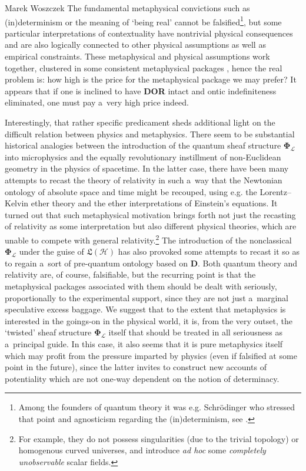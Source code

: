 \begin{artengenv}{Marek Woszczek}
The fundamental metaphysical convictions such as (in)determinism or the meaning of ‘being real' cannot be falsified\footnote{Among the founders of quantum theory it was e.g. Schrödinger who stressed that point and agnosticism regarding the (in)determinism, see
\parencite[][]{schrodinger_science_1935}.%
}, but some particular interpretations of contextuality have nontrivial physical consequences and are also logically connected to other physical assumptions as well as empirical constraints. These metaphysical and physical assumptions work together, clustered in some consistent metaphysical packages 
\parencite[e.g.][]{borges_quantum_2014}, %
 hence the real problem is: how high is the price for the metaphysical package we may prefer? It appears that if one is inclined to have \textbf{DOR} intact and ontic indefiniteness eliminated, one must pay a~very high price indeed.

Interestingly, that rather specific predicament sheds additional light on the difficult relation between physics and metaphysics. There seem to be substantial historical analogies between the introduction of the quantum sheaf structure $\bm{\Phi}_{\mathcal{L}}$ into microphysics and the equally revolutionary instillment of non-Euclidean geometry in the physics of spacetime. In the latter case, there have been many attempts to recast the theory of relativity in such a~way that the Newtonian ontology of absolute space and time might be recouped, using e.g. the Lorentz–Kelvin ether theory and the ether interpretations of Einstein's equations. It turned out that such metaphysical motivation brings forth not just the recasting of relativity as some interpretation but also different physical theories, which are unable to compete with general relativity.\footnote{For example, they do not possess singularities (due to the trivial topology) or homogenous curved universes, and introduce \textit{ad hoc} some \textit{completely unobservable} scalar fields.} The introduction of the nonclassical $\bm{\Phi}_{\mathcal{L}}$ under the guise of $\bm{\mathfrak{L}}(\mathcal{H})$ has also provoked some attempts to recast it so as to regain a~sort of pre-quantum ontology based on \textbf{D}. Both quantum theory and relativity are, of course, falsifiable, but the recurring point is that the metaphysical packages associated with them should be dealt with seriously, proportionally to the experimental support, since they are not just a~marginal speculative excess baggage. We suggest that to the extent that metaphysics is interested in the goings-on in the physical world, it is, from the very outset, the ‘twisted' sheaf structure $\bm{\Phi}_{\mathcal{L}}$ itself that should be treated in all seriousness as a~principal guide. In this case, it also seems that it is pure metaphysics itself which may profit from the pressure imparted by physics (even if falsified at some point in the future), since the latter invites to construct new accounts of potentiality which are not one-way dependent on the notion of determinacy.


\end{artengenv}
